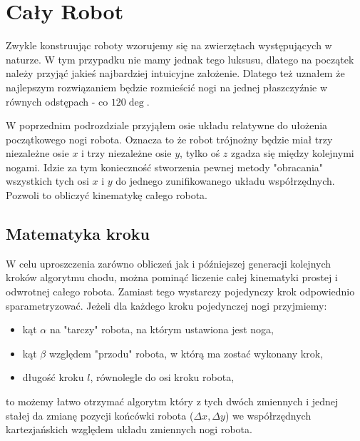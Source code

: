 \section{Cały Robot}
Zwykle konstruując roboty wzorujemy się na zwierzętach występujących w naturze. W tym przypadku nie mamy jednak tego luksusu, dlatego na początek należy przyjąć jakieś najbardziej intuicyjne założenie. Dlatego też uznałem że najlepszym rozwiązaniem będzie rozmieścić nogi na jednej płaszczyźnie w równych odstępach - co $120\deg$.

W poprzednim podrozdziale przyjąłem osie układu relatywne do ułożenia początkowego nogi robota. Oznacza to że robot trójnożny będzie miał trzy niezależne osie $x$ i trzy niezależne osie $y$, tylko oś $z$ zgadza się między kolejnymi nogami. Idzie za tym konieczność stworzenia pewnej metody "obracania" wszystkich tych osi $x$ i $y$ do jednego zunifikowanego układu współrzędnych. Pozwoli to obliczyć kinematykę całego robota.

\subsection{Matematyka kroku}
W celu uproszczenia zarówno obliczeń jak i późniejszej generacji kolejnych kroków algorytmu chodu, można pominąć liczenie całej kinematyki prostej i odwrotnej całego robota. Zamiast tego wystarczy pojedynczy krok odpowiednio sparametryzować. Jeżeli dla każdego kroku pojedynczej nogi przyjmiemy:
\begin{itemize}[noitemsep]
\item kąt $\alpha$ na "tarczy" robota, na którym ustawiona jest noga,
\item kąt $\beta$ względem "przodu" robota, w którą ma zostać wykonany krok,
\item długość kroku $l$, równolegle do osi kroku robota,
\end{itemize}
to możemy łatwo otrzymać algorytm który z tych dwóch zmiennych i jednej stałej da zmianę pozycji końcówki robota ($\Delta x, \Delta y$) we współrzędnych kartezjańskich względem układu zmiennych nogi robota.

